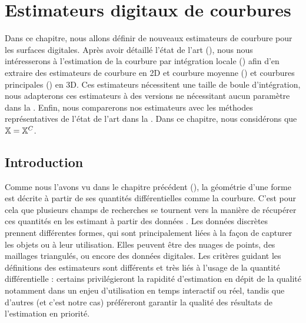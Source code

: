 %
\chapter{Estimateurs digitaux de courbures}
\label{sec:estimators}
%
%
\setcounter{minitocdepth}{4}
\minitoc
%
\newpage
%
Dans ce chapitre, nous allons définir de nouveaux estimateurs de courbure pour
les surfaces digitales. Après avoir détaillé l'état de l'art
(), nous nous intéresserons à l'estimation de la
courbure par intégration locale () afin d'en
extraire des estimateurs de courbure en 2D et courbure moyenne
() et courbures principales
() en 3D. Ces estimateurs nécessitent une taille de boule
d'intégration, nous adapterons ces estimateurs à des versions ne nécessitant
aucun paramètre dans la . Enfin, nous
comparerons nos estimateurs avec les méthodes représentatives de l'état de l'art
dans la . Dans ce chapitre, nous
considérons que $\mathbb{X} = \mathbb{X}^{C}$.
%
\section{Introduction}
\label{sec:estimators:introduction}
%
Comme nous l'avons vu dans le chapitre précédent (), la
géométrie d'une forme est décrite à partir de ses quantités différentielles
comme la courbure.
C'est pour cela que plusieurs champs de recherches se tournent vers la manière
de récupérer ces quantités en les estimant à partir des
données \cite{Petitjean2002, Wang2009}.
%
%
Les données discrètes prennent différentes formes, qui sont principalement liées à la façon de capturer les
objets ou à leur utilisation. Elles peuvent être des nuages de points, des
maillages triangulés, ou encore des données digitales. Les critères guidant les définitions des
estimateurs sont différents et très liés à l'usage de la quantité différentielle :
certains privilégieront la rapidité d'estimation en dépit de la qualité notamment
dans un enjeu d'utilisation en temps interactif ou réel, tandis que d'autres (et
c'est notre cas) préféreront garantir la qualité des résultats de l'estimation
en priorité.


